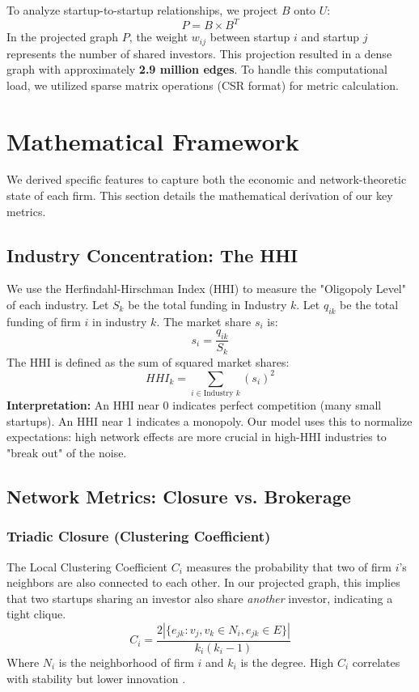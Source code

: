 \documentclass[11pt, a4paper]{article}
\begin{document}
To analyze startup-to-startup relationships, we project $B$ onto $U$:
\begin{equation}
    P = B \times B^T
\end{equation}
In the projected graph $P$, the weight $w_{ij}$ between startup $i$ and startup $j$ represents the number of shared investors. This projection resulted in a dense graph with approximately \textbf{2.9 million edges}. To handle this computational load, we utilized sparse matrix operations (CSR format) for metric calculation.

\section{Mathematical Framework}

We derived specific features to capture both the economic and network-theoretic state of each firm. This section details the mathematical derivation of our key metrics.

\subsection{Industry Concentration: The HHI}
We use the Herfindahl-Hirschman Index (HHI) to measure the "Oligopoly Level" of each industry.
Let $S_k$ be the total funding in Industry $k$. Let $q_{ik}$ be the total funding of firm $i$ in industry $k$.
The market share $s_i$ is:
\begin{equation}
    s_i = \frac{q_{ik}}{S_k}
\end{equation}
The HHI is defined as the sum of squared market shares:
\begin{equation}
    HHI_k = \sum_{i \in \text{Industry } k} (s_i)^2
\end{equation}
\textbf{Interpretation:} An HHI near 0 indicates perfect competition (many small startups). An HHI near 1 indicates a monopoly. Our model uses this to normalize expectations: high network effects are more crucial in high-HHI industries to "break out" of the noise.

\subsection{Network Metrics: Closure vs. Brokerage}

\subsubsection{Triadic Closure (Clustering Coefficient)}
The Local Clustering Coefficient $C_i$ measures the probability that two of firm $i$'s neighbors are also connected to each other. In our projected graph, this implies that two startups sharing an investor also share \textit{another} investor, indicating a tight clique.
\begin{equation}
    C_i = \frac{2 |\{e_{jk}: v_j, v_k \in N_i, e_{jk} \in E\}|}{k_i (k_i - 1)}
\end{equation}
Where $N_i$ is the neighborhood of firm $i$ and $k_i$ is the degree. High $C_i$ correlates with stability but lower innovation \citep{coleman1988}.
\end{document}
